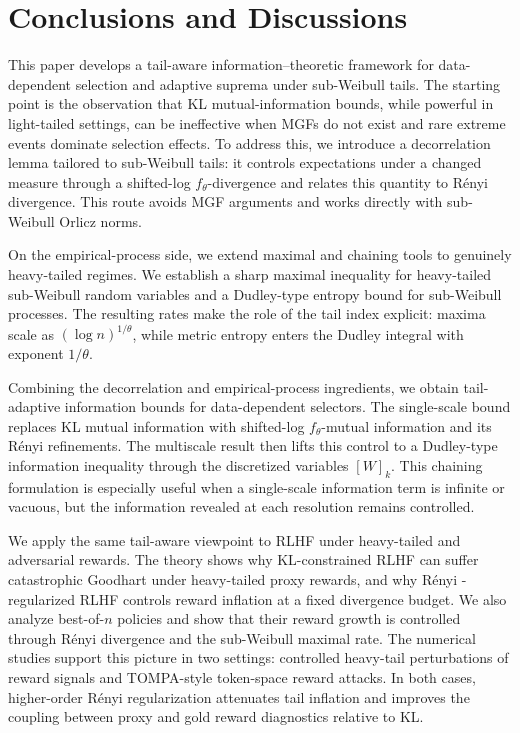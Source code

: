 \documentclass[11pt]{article}
\providecommand{\Renyi}{R\'enyi }
\begin{document}
\section{Conclusions and Discussions}\label{sec:conclusion}

This paper develops a tail-aware information--theoretic framework for
data-dependent selection and adaptive suprema under sub-Weibull tails. The
starting point is the observation that KL mutual-information bounds,
while powerful in light-tailed settings, can be ineffective when MGFs do not
exist and rare extreme events dominate selection effects. To address this, we
introduce a decorrelation lemma tailored to sub-Weibull tails: it controls
expectations under a changed measure through a shifted-log $f_\theta$-divergence
and relates this quantity to \Renyi divergence. This route avoids MGF arguments
and works directly with sub-Weibull Orlicz norms.

On the empirical-process side, we extend maximal and chaining tools to genuinely
heavy-tailed regimes. We establish a sharp maximal inequality for heavy-tailed
sub-Weibull random variables and a Dudley-type entropy bound for sub-Weibull
processes. The resulting rates make the role of the tail index explicit: maxima
scale as $(\log n)^{1/\theta}$, while metric entropy enters the Dudley integral
with exponent $1/\theta$.

Combining the decorrelation and empirical-process ingredients, we obtain
tail-adaptive information bounds for data-dependent selectors. The single-scale
bound replaces KL mutual information with shifted-log $f_\theta$-mutual
information and its \Renyi refinements. The multiscale result then lifts this
control to a Dudley-type information inequality through the discretized variables
$[W]_k$. This chaining formulation is especially useful when a single-scale
information term is infinite or vacuous, but the information revealed at each
resolution remains controlled.

We apply the same tail-aware viewpoint to RLHF under heavy-tailed and
adversarial rewards. The theory shows why KL-constrained RLHF can suffer
catastrophic Goodhart under heavy-tailed proxy rewards, and why
\Renyi-regularized RLHF controls reward inflation at a fixed divergence budget.
We also analyze best-of-$n$ policies and show that their reward growth is
controlled through \Renyi divergence and the sub-Weibull maximal rate. The
numerical studies support this picture in two settings: controlled heavy-tail
perturbations of reward signals and TOMPA-style token-space reward attacks. In
both cases, higher-order \Renyi regularization attenuates tail inflation and
improves the coupling between proxy and gold reward diagnostics relative to KL.
\end{document}
